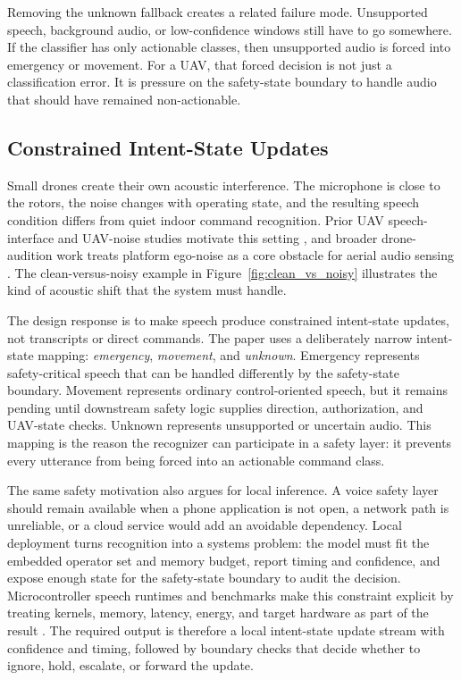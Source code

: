 Removing the unknown fallback creates a related failure mode. Unsupported speech, background audio, or low-confidence windows still have to go somewhere. If the classifier has only actionable classes, then unsupported audio is forced into emergency or movement. For a UAV, that forced decision is not just a classification error. It is pressure on the safety-state boundary to handle audio that should have remained non-actionable.

\subsection{Constrained Intent-State Updates}

Small drones create their own acoustic interference. The microphone is close to the rotors, the noise changes with operating state, and the resulting speech condition differs from quiet indoor command recognition. Prior UAV speech-interface and UAV-noise studies motivate this setting \cite{oneata19_interspeech,oneata2021multimodal,miesikowska2021uavnoise,park2023uavUAV}, and broader drone-audition work treats platform ego-noise as a core obstacle for aerial audio sensing \cite{chevtchenko2025drone_ssl}. The clean-versus-noisy example in Figure~\ref{fig:clean_vs_noisy} illustrates the kind of acoustic shift that the system must handle.

The design response is to make speech produce constrained intent-state updates, not transcripts or direct commands. The paper uses a deliberately narrow intent-state mapping: \emph{emergency}, \emph{movement}, and \emph{unknown}. Emergency represents safety-critical speech that can be handled differently by the safety-state boundary. Movement represents ordinary control-oriented speech, but it remains pending until downstream safety logic supplies direction, authorization, and UAV-state checks. Unknown represents unsupported or uncertain audio. This mapping is the reason the recognizer can participate in a safety layer: it prevents every utterance from being forced into an actionable command class.

The same safety motivation also argues for local inference. A voice safety layer should remain available when a phone application is not open, a network path is unreliable, or a cloud service would add an avoidable dependency. Local deployment turns recognition into a systems problem: the model must fit the embedded operator set and memory budget, report timing and confidence, and expose enough state for the safety-state boundary to audit the decision. Microcontroller speech runtimes and benchmarks make this constraint explicit by treating kernels, memory, latency, energy, and target hardware as part of the result \cite{david2021tflm,lai2018cmsisnn,banbury2021mlperftiny}. The required output is therefore a local intent-state update stream with confidence and timing, followed by boundary checks that decide whether to ignore, hold, escalate, or forward the update.
